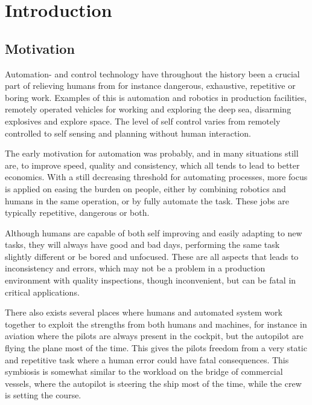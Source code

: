 
\chapter{Introduction}\label{chapter:introduction}
\section{Motivation}\label{sec:motivation}
Automation- and control technology have throughout the history been a crucial part of relieving humans from for instance dangerous, exhaustive, repetitive or boring work. Examples of this is automation and robotics in production facilities, remotely operated vehicles for working and exploring the deep sea, disarming explosives and explore space. The level of self control varies from remotely controlled to self sensing and planning without human interaction.

The early motivation for automation was probably, and in many situations still are, to improve speed, quality and consistency, which all tends to lead to better economics. With a still decreasing threshold for automating processes, more focus is applied on easing the burden on people, either by combining robotics and humans in the same operation, or by fully automate the task. These jobs are typically repetitive, dangerous or both.

Although humans are capable of both self improving and easily adapting to new tasks, they will always have good and bad days, performing the same task slightly different or be bored and unfocused. These are all aspects that leads to inconsistency and errors, which may not be a problem in a production environment with quality inspections, though inconvenient, but can be fatal in critical applications. 

There also exists several places where humans and automated system work together to exploit the strengths from both humans and machines, for instance in aviation where the pilots are always present in the cockpit, but the autopilot are flying the plane most of the time. This gives the pilots freedom from a very static and repetitive task where a human error could have fatal consequences. This symbiosis is somewhat similar to the workload on the bridge of commercial vessels, where the autopilot is steering the ship most of the time, while the crew is setting the course. 

